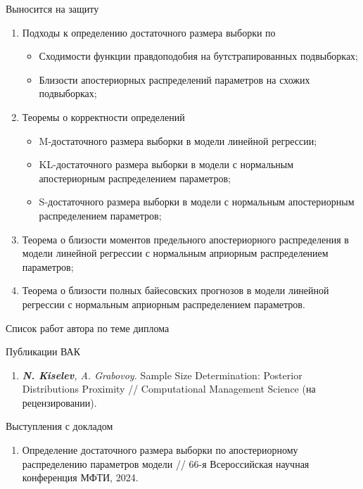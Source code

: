 \documentclass[aspectratio=169]{beamer}
\begin{document}
\begin{frame}{Выносится на защиту}
    \begin{enumerate}
        \item Подходы к определению достаточного размера выборки по
        \begin{itemize}
            \item Сходимости функции правдоподобия на бутстрапированных подвыборках;
            \item Близости апостериорных распределений параметров на схожих подвыборках;
        \end{itemize}
        \item Теоремы о корректности определений
        \begin{itemize}
            \item M-достаточного размера выборки в модели линейной регрессии;
            \item KL-достаточного размера выборки в модели с нормальным апостериорным распределением параметров;
            \item S-достаточного размера выборки в модели с нормальным апостериорным распределением параметров;
        \end{itemize}
        \item Теорема о близости моментов предельного апостериорного распределения в модели линейной регрессии с нормальным априорным распределением параметров;
        \item Теорема о близости полных байесовских прогнозов в модели линейной регрессии с нормальным априорным распределением параметров.
    \end{enumerate}
\end{frame}

\begin{frame}{Список работ автора по теме диплома}
    \begin{block}{Публикации ВАК}
        \begin{enumerate}
            \item \textit{\textbf{N. Kiselev}, A. Grabovoy.} Sample Size Determination: Posterior Distributions Proximity // Computational Management Science (на рецензировании).
        \end{enumerate}
    \end{block}
    \begin{block}{Выступления с докладом}
        \begin{enumerate}
            \item Определение достаточного размера выборки по апостериорному распределению параметров модели // 66-я Всероссийская научная конференция МФТИ, 2024.
        \end{enumerate}
    \end{block}
\end{frame}
\end{document}
